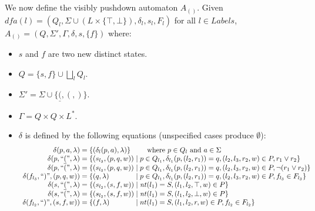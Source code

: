\documentclass[acmsmall,review,anonymous]{acmart}\settopmatter{printfolios=true,printccs=false,printacmref=false}
\newcommand{\T}{\Sigma} %
\newcommand{\Labels}{L} %
\newcommand{\reqpl}{\underline{(}}
\newcommand{\reqpr}{)}
\newcommand{\pospl}{(}
\newcommand{\pospr}{)}
\newcommand{\posp}[1]{\pospl#1\pospr}
\newcommand{\dfa}{\mathit{dfa}} %
\newcommand{\labelnt}{\mathit{nt}} %
\begin{document}
\noindent We now define the visibly pushdown automaton $A_{\posp{}}$. Given $\dfa(l) = (Q_l, \T \cup (\Labels \times \{\top, \bot\}), \delta_l, s_l, F_l)$ for all $l \in Labels$, $A_{\posp{}} = (Q, \T', \Gamma, \delta, s, \{f\})$ where:

\begin{itemize}
\item $s$ and $f$ are two new distinct states.
\item $Q = \{s, f\} \cup \bigsqcup_l Q_l$.
\item $\T' = \T \cup \{\reqpl, \pospl, \pospr\}$.
\item $\Gamma = Q \times Q \times \Labels^{*}$.
\item $\delta$ is defined by the following equations (unspecified cases produce $\emptyset$):
  $$
  \begin{array}{r@{\;=\;}l@{\;\mid\;}l}
    \delta(p, a, \lambda)
    & \multicolumn{2}{@{}l@{}}{\{(\delta_l(p, a), \lambda)\} \qquad \text{ where } p \in Q_l \text{ and } a \in \T} \\

    \delta(p, \text{``}\reqpl\text{''}, \lambda)
    & \{ (s_{l_3}, (p, q, w))
    & p \in Q_{l_1}, \delta_{l_1}(p, (l_2, r_1)) = q, (l_2, l_3, r_2, w) \in P, r_1 \lor r_2 \} \\

    \delta(p, \text{``}\pospl\text{''}, \lambda)
    & \{ (s_{l_3}, (p, q, w))
    & p \in Q_{l_1}, \delta_{l_1}(p, (l_2, r_1)) = q, (l_2, l_3, r_2, w) \in P, \neg (r_1 \lor r_2) \} \\

    \delta(f_{l_3}, \text{``}\reqpr\text{''}, (p, q, w))
    & \{ (q, \lambda)
    & p \in Q_{l_1}, \delta_{l_1}(p, (l_2, r_1)) = q, (l_2, l_3, r_2, w) \in P, f_{l_3} \in F_{l_3} \} \\

    \delta(s, \text{``}\reqpl\text{''}, \lambda)
    & \{ (s_{l_2}, (s, f, w))
    & \labelnt(l_1) = S, (l_1, l_2, \top, w) \in P \} \\

    \delta(s, \text{``}\pospl\text{''}, \lambda)
    & \{ (s_{l_2}, (s, f, w))
    & \labelnt(l_1) = S, (l_1, l_2, \bot, w) \in P \} \\

    \delta(f_{l_2}, \text{``}\reqpr\text{''}, (s, f, w))
    & \{ (f, \lambda)
    & nt(l_1) = S, (l_1, l_2, r, w) \in P, f_{l_2} \in F_{l_2}\} \\
  \end{array}
  $$
\end{itemize}
\end{document}
